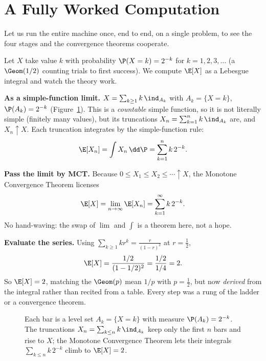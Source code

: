 \section{A Fully Worked Computation}
\label{ch37:worked}

Let us run the entire machine once, end to end, on a single problem, to see the
four stages and the convergence theorems cooperate.

\begin{example}
\label{ch37:worked-geom}
Let $X$ take value $k$ with probability $\P(X=k)=2^{-k}$ for $k=1,2,3,\dots$
(a $\Geom(1/2)$ counting trials to first success). We compute $\E[X]$ as a
Lebesgue integral and watch the theory work.

\textbf{As a simple-function limit.} $X=\sum_{k\ge1} k\,\ind_{A_k}$ with
$A_k=\{X=k\}$, $\P(A_k)=2^{-k}$ (Figure~\ref{ch37:fig-geom-pmf}). This is a \emph{countable} simple function, so
it is not literally simple (finitely many values), but its truncations
$X_n=\sum_{k=1}^n k\,\ind_{A_k}$ are, and $X_n\uparrow X$. Each truncation
integrates by the simple-function rule:
\[
  \E[X_n]=\int X_n\,\dd\P=\sum_{k=1}^n k\,2^{-k}.
\]

\textbf{Pass the limit by MCT.} Because $0\le X_1\le X_2\le\cdots\uparrow X$,
the Monotone Convergence Theorem licenses
\[
  \E[X]=\lim_{n\to\infty}\E[X_n]=\sum_{k=1}^\infty k\,2^{-k}.
\]
No hand-waving: the swap of $\lim$ and $\int$ is a theorem here, not a hope.

\textbf{Evaluate the series.} Using $\sum_{k\ge1} k r^{k}=\frac{r}{(1-r)^2}$ at
$r=\tfrac12$,
\[
  \E[X]=\frac{1/2}{(1-1/2)^2}=\frac{1/2}{1/4}=2.
\]
So $\E[X]=2$, matching the $\Geom(p)$ mean $1/p$ with $p=\tfrac12$, but now
\emph{derived} from the integral rather than recited from a table. Every step
was a rung of the ladder or a convergence theorem.
\end{example}

\begin{figure}[H]
\centering
{}
\caption{Each bar is a level set $A_k=\{X=k\}$ with measure $\P(A_k)=2^{-k}$.
The truncations $X_n=\sum_{k\le n}k\,\ind_{A_k}$ keep only the first $n$ bars and
rise to $X$; the Monotone Convergence Theorem lets their integrals
$\sum_{k\le n}k\,2^{-k}$ climb to $\E[X]=2$.}
\label{ch37:fig-geom-pmf}
\end{figure}

